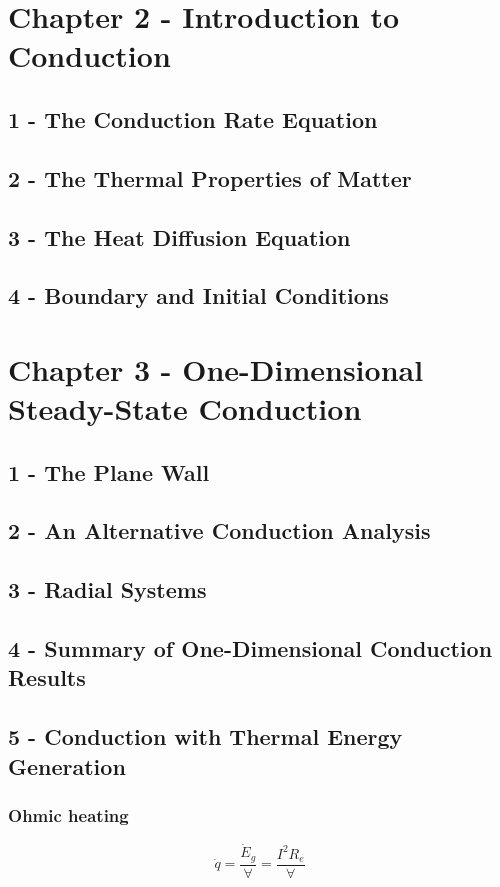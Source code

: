 \documentclass[10pt,landscape]{article}
\begin{document}
\begin{multicols}{3}
\section{Chapter 2 - Introduction to Conduction}
\subsection{1 - The Conduction Rate Equation}
\subsection{2 - The Thermal Properties of Matter}
\subsection{3 - The Heat Diffusion Equation}
\subsection{4 - Boundary and Initial Conditions}

\section{Chapter 3 - One-Dimensional Steady-State Conduction}
\subsection{1 - The Plane Wall}
\subsection{2 - An Alternative Conduction Analysis}
\subsection{3 - Radial Systems}
\subsection{4 - Summary of One-Dimensional Conduction Results}
\subsection{5 - Conduction with Thermal Energy Generation}
\subsubsection{Ohmic heating}
\begin{equation}
    \dot{q}=\frac{\dot{E}_g}{\forall}=\frac{I^2R_e}{\forall}
\end{equation}

\end{multicols}
\end{document}
